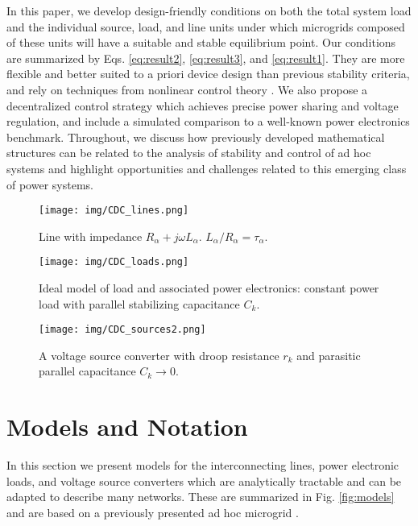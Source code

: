 \documentclass[letterpaper, 10 pt, conference]{ieeeconf}
\begin{document}
In this paper, we develop design-friendly conditions on both the total system load and the individual source, load, and line units under which microgrids composed of these units will have a suitable and stable equilibrium point. Our conditions are summarized by Eqs. \eqref{eq:result2}, \eqref{eq:result3}, and \eqref{eq:result1}. They are more flexible and better suited to a priori device design than previous stability criteria, and rely on techniques from nonlinear control theory \cite{Brayton:1964gr,Jeltsema:2003jz,Jeltsema:2009jd,Feijer:2010ia}. We also propose a decentralized control strategy which achieves precise power sharing and voltage regulation, and include a simulated comparison to a well-known power electronics benchmark. Throughout, we discuss how previously developed mathematical structures can be related to the analysis of stability and control of ad hoc systems and highlight opportunities and challenges related to this emerging class of power systems.

\begin{figure*}[b!]
\begin{subfigure}{.271\textwidth}
  \centering
  \texttt{[image: img/CDC\_lines.png]}
  \caption{Line with impedance $R_{\alpha} + j\omega L_{\alpha}$. $L_{\alpha}/R_{\alpha} = \tau_{\alpha}$.\newline}
  \label{fig:line}
\end{subfigure}
\hfill
\begin{subfigure}{.314\textwidth}
  \centering
  \texttt{[image: img/CDC\_loads.png]}
  \caption{Ideal model of load and associated power electronics: constant power load with parallel stabilizing capacitance $C_k$.}
  \label{fig:load}
\end{subfigure}
\hfill
\begin{subfigure}{.314\textwidth}
  \centering
  \texttt{[image: img/CDC\_sources2.png]}
  \caption{A voltage source converter with droop resistance $r_k$ and parasitic parallel capacitance $C_k \to 0$.}
  \label{fig:source}
\end{subfigure}
\caption{Representations of lines, loads, and sources in our dc microgrid.}
\label{fig:models}
\end{figure*}

\section{Models and Notation}\label{sec:models}

In this section we present models for the interconnecting lines, power electronic loads, and voltage source converters which are analytically tractable and can be adapted to describe many networks. These are summarized in Fig. \ref{fig:models} and are based on a previously presented ad hoc microgrid \cite{ugrid}.
\end{document}
